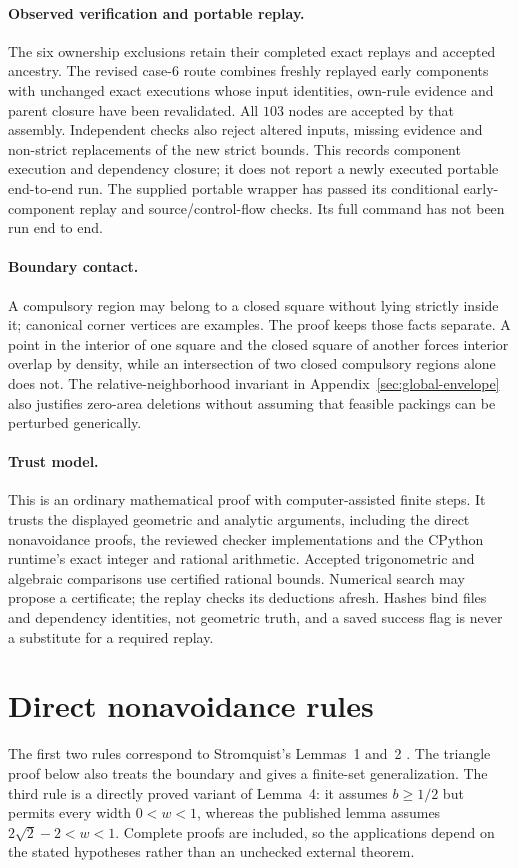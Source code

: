\documentclass[11pt]{article}
\begin{document}
\paragraph{Observed verification and portable replay.}
The six ownership exclusions retain their completed exact replays and
accepted ancestry. The revised case-$6$ route combines freshly replayed
early components with unchanged exact executions whose input identities,
own-rule evidence and parent closure have been revalidated. All $103$
nodes are accepted by that assembly. Independent checks also reject
altered inputs, missing evidence and non-strict replacements of the new
strict bounds. This records component execution and dependency closure;
it does not report a newly executed portable end-to-end run. The supplied
portable wrapper has passed its conditional early-component replay and
source/control-flow checks. Its full command has not been run end to end.

\paragraph{Boundary contact.}
A compulsory region may belong to a closed square without lying strictly
inside it; canonical corner vertices are examples. The proof keeps those
facts separate. A point in the interior of one square and the closed
square of another forces interior overlap by density, while an
intersection of two closed compulsory regions alone does not.
The relative-neighborhood invariant in
Appendix~\ref{sec:global-envelope} also justifies zero-area deletions
without assuming that feasible packings can be perturbed generically.

\paragraph{Trust model.}
This is an ordinary mathematical proof with computer-assisted finite
steps. It trusts the displayed geometric and analytic arguments, including
the direct nonavoidance proofs, the reviewed checker implementations and the CPython
runtime's exact integer and rational arithmetic. Accepted trigonometric
and algebraic comparisons use certified rational bounds. Numerical search
may propose a certificate; the replay checks its deductions afresh.
Hashes bind files and dependency identities, not geometric truth, and a
saved success flag is never a substitute for a required replay.

\clearpage
\appendix


\section{Direct nonavoidance rules}\label{app:nonavoidance}
The first two rules correspond to Stromquist's Lemmas~1 and~2
\cite[ p.~2]{stromquist}. The triangle proof below also treats the boundary
and gives a finite-set generalization. The third rule is a directly proved variant of Lemma~4: it assumes
$b\ge1/2$ but permits every width $0<w<1$, whereas the published
lemma assumes $2\sqrt2-2<w<1$. Complete proofs are included, so the applications
depend on the stated hypotheses rather than an unchecked external theorem.
\end{document}
